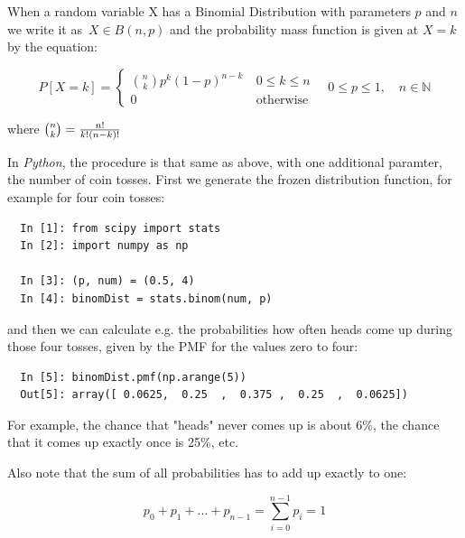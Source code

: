 When a random variable X has a Binomial Distribution with parameters $p$ and $n$ we write it as $\,X \in B(n,p)$ and the probability mass function is given at $X=k$ by the equation:

\begin{equation}
    P\left[X = k\right] = \begin{cases} {n \choose k} p^k \left(1-p\right)^{n-k}\ & 0 \le k \le n \\ 0 & \mbox{otherwise} \end{cases} \quad 0 \leq p \leq 1, \quad n \in \mathbb{N}
\end{equation}

where ${n \choose k}={n! \over k!(n-k)!}$

\vspace{5 mm}

In \emph{Python}, the procedure is that same as above, with one additional paramter, the number of coin tosses. First we generate the frozen distribution function, for example for four coin tosses:

\begin{lstlisting}
  In [1]: from scipy import stats
  In [2]: import numpy as np

  In [3]: (p, num) = (0.5, 4)
  In [4]: binomDist = stats.binom(num, p)
\end{lstlisting}

and then we can calculate e.g. the probabilities how often heads come up during those four tosses, given by the PMF for the values zero to four:

\begin{lstlisting}
  In [5]: binomDist.pmf(np.arange(5))
  Out[5]: array([ 0.0625,  0.25  ,  0.375 ,  0.25  ,  0.0625])
\end{lstlisting}

For example, the chance that "heads" never comes up is about 6\%, the chance that it comes up exactly once is 25\%, etc.

Also note that the sum of all probabilities has to add up exactly to one:

\begin{equation}\label{eq:discreteSum}
  p_0 + p_1 + ... + p_{n-1} = \sum_{i=0}^{n-1} p_i = 1
\end{equation}

